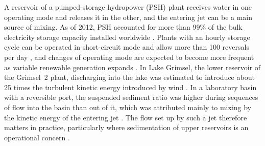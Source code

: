 \label{sec:intro}

\begin{en}[I-1]
A reservoir of a pumped-storage hydropower (PSH) plant receives water in one operating mode and releases it in the other, and the entering jet can be a main source of mixing. As of 2012, PSH accounted for more than 99\% of the bulk electricity storage capacity installed worldwide \citep{rehmanPumpedHydroEnergy2015} . Plants with an hourly storage cycle can be operated in short-circuit mode and allow more than 100 reversals per day \citep{huntExistingNewArrangements2020} , and changes of operating mode are expected to become more frequent as variable renewable generation expands . In Lake Grimsel, the lower reservoir of the Grimsel~2 plant, discharging into the lake was estimated to introduce about 25 times the turbulent kinetic energy introduced by wind \citep{mullerFlowFieldReservoir2018}. In a laboratory basin with a reversible port, the suspended sediment ratio  was higher during sequences of flow into the basin than out of it, which was attributed mainly to mixing by the kinetic energy of the entering jet \citep{mullerExperimentsEffectInflow2017}. The flow set up by such a jet therefore matters in practice, particularly where sedimentation of upper reservoirs is an operational concern .
\end{en}
